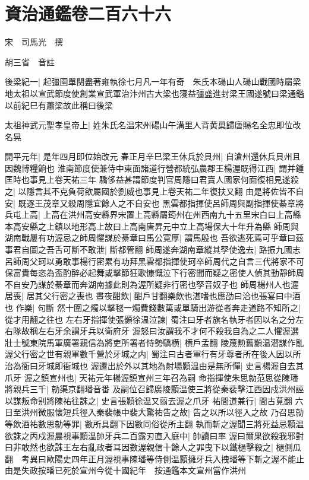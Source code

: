 \chapter{資治通鑑卷二百六十六}
宋　司馬光　撰

胡三省　音註

後梁紀一|{
	起彊圉單闋盡著雍執徐七月凡一年有奇　朱氏本碭山人碭山戰國時屬梁地太祖以宣武節度使創業宣武軍治汴州古大梁也寖益彊盛進封梁王國遂號曰梁通鑑以前紀巳有蕭梁故此稱曰後梁}


太祖神武元聖孝皇帝上|{
	姓朱氏名温宋州碭山午溝里人背黄巢歸唐賜名全忠即位改名晃}


開平元年|{
	是年四月即位始改元}
春正月辛巳梁王休兵於貝州|{
	自滄州還休兵貝州且因魏博糧餉也}
淮南節度使兼侍中東面諸道行營都統弘農郡王楊渥既得江西|{
	謂并鍾匡時也事見上卷天祐三年}
驕侈益甚謂節度判官周隱曰君賣人國家何面復相見遂殺之|{
	以隱言其不克負荷欲屬國於劉威也事見上卷天祐二年復扶又翻}
由是將佐皆不自安|{
	既逐王茂章又殺周隱宜餘人之不自安也}
黑雲都指揮使呂師周與副指揮使綦章將兵屯上高|{
	上高在洪州高安縣界宋置上高縣屬筠州在州西南九十五里宋白曰上高縣本高安縣之上鎮以地形高上故曰上高南唐昇元中立上高場保大十年升為縣}
師周與湖南戰屢有功渥忌之師周懼謀於綦章曰馬公寛厚|{
	謂馬殷也}
吾欲逃死焉可乎章曰茲事君自圖之吾舌可斷不敢泄|{
	斷都管翻}
師周遂奔湖南章縱其孥使逸去|{
	路振九國志呂師周父珂以勇敢事楊行密累有功拜黑雲都指揮使珂卒師周代之自言三代將家不可保富貴每恣為盃酌醉必起舞或擊節狂歌慷慨泣下行密聞而疑之密使人偵其動靜師周不自安乃謀於綦章而奔湖南據此則為渥所疑非行密也孥音奴子也}
師周楊州人也渥居喪|{
	居其父行密之喪也}
晝夜酣飲|{
	酣戶甘翻樂飲也湛嗜也應劭曰洽也張宴曰中酒也}
作樂|{
	句斷}
然十圍之燭以擊毬一燭費錢數萬或單騎出游從者奔走道路不知所之|{
	從才用翻之往也}
左右牙指揮使張顥徐温泣諫|{
	蜀注曰牙者旗名執牙者因以名之分左右隊故稱左右牙余謂牙兵以衛府牙}
渥怒曰汝謂我不才何不殺我自為之二人懼渥選壯士號東院馬軍廣署親信為將吏所署者恃勢驕横|{
	横戶孟翻}
陵蔑勲舊顥温潜謀作亂渥父行密之世有親軍數千營於牙城之内|{
	蜀注曰古者軍行有牙尊者所在後人因以所治為衙曰牙城即衙城也}
渥遷出於外以其地為射場顥温由是無所憚|{
	史言楊渥自去其爪牙}
渥之鎮宣州也|{
	天祐元年楊渥鎮宣州三年召為嗣}
命指揮使朱思勍范思從陳璠將親兵三千|{
	勍渠京翻璠音番}
及嗣位召歸廣陵顥温使三將從秦裴擊江西因戍洪州誣以謀叛命别將陳祐往誅之|{
	史言張顥徐温又翦去渥之爪牙}
祐間道兼行|{
	間古莧翻}
六日至洪州微服懷短兵徑入秦裴帳中裴大驚祐告之故|{
	告之以所以徑入之故}
乃召思勍等飲酒祐數思勍等罪|{
	數所具翻下因數同俗從所主翻}
執而斬之渥聞三將死益忌顥温欲誅之丙戍渥晨視事顥温帥牙兵二百露刃直入庭中|{
	帥讀曰率}
渥曰爾果欲殺我邪對曰非敢然也欲誅王左右亂政者耳因數渥親信十餘人之罪曳下以鐵檛擊殺之|{
	檛側瓜翻　考異曰歐陽史四年正月渥視事陳璠等侍側温顥擁牙兵入拽璠等下斬之渥不能止由是失政按璠已死於宣州今從十國紀年　按通鑑本文宣州當作洪州}
